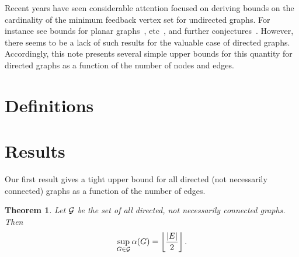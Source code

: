 \documentclass[journal,12pt,onecolumn]{IEEETran}  %
\newtheorem{theorem}{Theorem}[section]
\begin{document}

%
\IEEEpeerreviewmaketitle



Recent years have seen considerable attention focused on deriving bounds on the cardinality of the minimum feedback vertex set for undirected graphs. For instance see bounds for planar graphs~\cite{planar}, etc~\cite{other}, and further conjectures~\cite{conj}.
However, there seems to be a lack of such results for the valuable case of directed graphs.
Accordingly, this note presents several simple upper bounds for this quantity for directed graphs as a function of the number of nodes and edges.

\section{Definitions}

\section{Results}
Our first result gives a tight upper bound for all directed (not necessarily connected) graphs as a function of the number of edges.
\begin{theorem}\label{thm:main}
Let $\mathcal{G}$ be the set of all directed, not necessarily connected graphs.
Then
\begin{equation}\label{eq:main}
\sup_{G\in\gee}\alpha(G) = \left\lfloor\frac{|E|}{2}\right\rfloor.
\end{equation}
\end{theorem}
\end{document}
